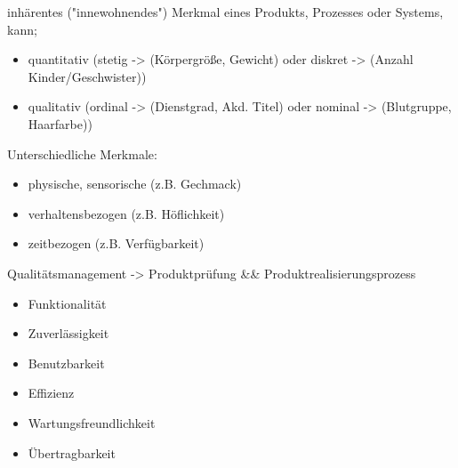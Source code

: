 \documentclass[12pt]{article}
\begin{document}
\begin{note}
\end{note}

\begin{note}
    \begin{field}
        inhärentes ("innewohnendes") Merkmal eines Produkts, Prozesses oder Systems, kann;
        \begin{itemize}
            \item quantitativ (stetig -> (Körpergröße, Gewicht) oder diskret -> (Anzahl Kinder/Geschwister))
            \item qualitativ (ordinal -> (Dienstgrad, Akd. Titel) oder nominal -> (Blutgruppe, Haarfarbe))
        \end{itemize}
        Unterschiedliche Merkmale:
        \begin{itemize}
            \item physische, sensorische (z.B. Gechmack)
            \item verhaltensbezogen (z.B. Höflichkeit)
            \item zeitbezogen (z.B. Verfügbarkeit)
        \end{itemize}
        Qualitätsmanagement -> Produktprüfung && Produktrealisierungsprozess
    \end{field}
\end{note}

\begin{note}
\end{note}

\begin{note}
\end{note}

\begin{note}

    \begin{field}
        \begin{itemize}
            \item Funktionalität
            \item Zuverlässigkeit
            \item Benutzbarkeit
            \item Effizienz
            \item Wartungsfreundlichkeit
            \item Übertragbarkeit
        \end{itemize}
    \end{field}
\end{note}
\end{document}
